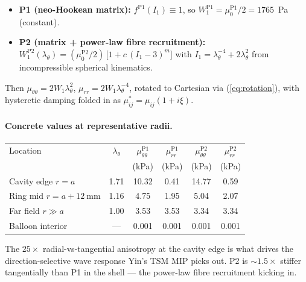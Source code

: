 \documentclass[11pt,letterpaper]{article}
\begin{document}
\begin{itemize}
\item \textbf{P1 (neo-Hookean matrix):} $f^{\text{P1}}(I_1) \equiv 1$,
      so $W_1^{\text{P1}} = \mu_0^{\text{P1}}/2 = 1765$~Pa (constant).
\item \textbf{P2 (matrix + power-law fibre recruitment):}
$W_1^{\text{P2}}(\lambda_\theta) = (\mu_0^{\text{P2}}/2)\,\bigl[1 + c\,(I_1 - 3)^m\bigr]$
with $I_1 = \lambda_\theta^{-4} + 2\lambda_\theta^{2}$ from
incompressible spherical kinematics.
\end{itemize}

Then $\mu_{\theta\theta} = 2W_1\lambda_\theta^{2}$,
$\mu_{rr} = 2W_1\lambda_\theta^{-4}$, rotated to Cartesian via
(\ref{eq:rotation}), with hysteretic damping folded in as
$\mu^{*}_{ij} = \mu_{ij}(1 + i\xi)$.

\paragraph{Concrete values at representative radii.}

\begin{center}
\begin{tabular}{lccccc}
\toprule
Location & $\lambda_\theta$ & $\mu_{\theta\theta}^{\text{P1}}$ & $\mu_{rr}^{\text{P1}}$ & $\mu_{\theta\theta}^{\text{P2}}$ & $\mu_{rr}^{\text{P2}}$ \\
         &                  & (kPa) & (kPa) & (kPa) & (kPa) \\
\midrule
Cavity edge $r=a$            & 1.71 & 10.32 & 0.41 & 14.77 & 0.59 \\
Ring mid $r=a+\SI{12}{\milli\metre}$ & 1.16 & 4.75  & 1.95  & 5.04  & 2.07 \\
Far field $r\gg a$           & 1.00 & 3.53  & 3.53  & 3.34  & 3.34 \\
Balloon interior             & ---  & 0.001 & 0.001 & 0.001 & 0.001 \\
\bottomrule
\end{tabular}
\end{center}

The $25\times$ radial-vs-tangential anisotropy at the cavity edge is
what drives the direction-selective wave response Yin's TSM MIP
picks out. P2 is ${\sim}1.5\times$ stiffer tangentially than P1 in
the shell — the power-law fibre recruitment kicking in.
\end{document}
